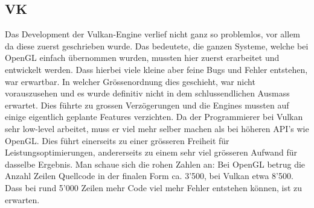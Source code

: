 \documentclass[titlepage, 11pt, a4paper, ngerman]{article}
\begin{document}
\subsection{VK}
Das Development der Vulkan-\gls{Engine} verlief nicht ganz so problemlos, vor allem da diese zuerst geschrieben wurde. Das bedeutete, die ganzen Systeme, welche bei \acrshort{OpenGL} einfach übernommen wurden, mussten hier zuerst erarbeitet und entwickelt werden. Dass hierbei viele kleine aber feine Bugs und Fehler entstehen, war erwartbar. In welcher Grössenordnung dies geschieht, war nicht vorauszusehen und es wurde definitiv nicht in dem schlussendlichen Ausmass erwartet. Dies führte zu grossen Verzögerungen und die \glspl{Engine} mussten auf einige eigentlich geplante Features verzichten. Da der Programmierer bei Vulkan sehr low-level arbeitet, muss er viel mehr selber machen als bei höheren \acrshort{API}'s wie \acrshort{OpenGL}. Dies führt einerseits zu einer grösseren Freiheit für Leistungsoptimierungen, andererseits zu einem sehr viel grösseren Aufwand für dasselbe Ergebnis. Man schaue sich die rohen Zahlen an: Bei \acrshort{OpenGL} betrug die Anzahl Zeilen Quellcode in der finalen Form ca. 3'500, bei Vulkan etwa 8'500. Dass bei rund 5'000 Zeilen mehr Code viel mehr Fehler entstehen können, ist zu erwarten.
\end{document}
